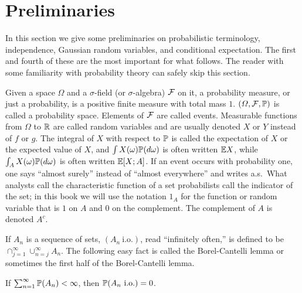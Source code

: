 \label{ch1}

\section{Preliminaries}\label{ch1_sec1}

In this section we give some preliminaries on probabilistic terminology, independence, Gaussian random variables, and conditional expectation. The first and fourth of these are the most important for what follows. The reader with some familiarity with probability theory can safely skip this section.


Given a space $\Omega$ and a $\sigma$-field (or $\sigma$-algebra) $\FC$ on it, a probability measure, or just a probability, is a positive finite measure with total mass $1$. $(\Omega, \FC, \P)$ is called a probability space. Elements of $\FC$ are called events. Measurable functions from $\Omega$ to $\R$ are called random variables and are usually denoted $X$ or $Y$ instead of $f$ or $g$. The integral of $X$ with respect to $\P$ is called the expectation of $X$ or the expected value of $X$, and $\int X(\omega)\P(d\omega)$ is often written $\E X$, while $\int_A X(\omega)\P(d\omega)$ is often written $\E[X; A]$. If an event occurs with probability one, one says ``almost surely'' instead of ``almost everywhere'' and writes a.s.\ What analysts call the characteristic function of a set probabilists call the indicator of the set; in this book we will use the notation $1_A$ for the function or random variable that is $1$ on $A$ and $0$ on the complement. The complement of $A$ is denoted $A^c$.

If $A_n$ is a sequence of sets, $(A_n~\text{i.o.})$, read ``infinitely often,'' is defined to be $\cap_{j=1}^{\infty} \cup_{n=j}^{\infty} A_n$. The following easy fact is called the Borel-Cantelli lemma or sometimes the first half of the Borel-Cantelli lemma.

\begin{proposition}\label{prop:ch1_1.1}
If $\sum_{n=1}^{\infty} \P(A_n) < \infty$, then $\P(A_n~\textnormal{i.o.}) = 0$.
\end{proposition}

